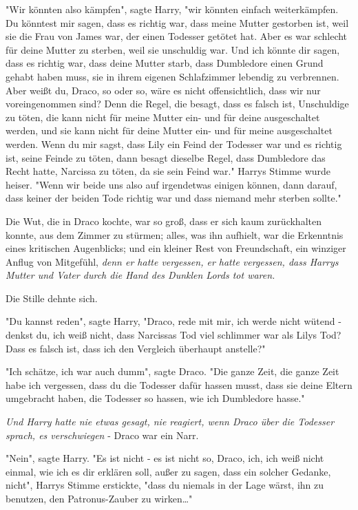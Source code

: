 {"Wir könnten also kämpfen", sagte Harry, "wir könnten einfach weiterkämpfen. Du könntest mir sagen, dass es richtig war, dass meine Mutter gestorben ist, weil sie die Frau von James war, der einen Todesser getötet hat. Aber es war schlecht für deine Mutter zu sterben, weil sie unschuldig war. Und ich könnte dir sagen, dass es richtig war, dass deine Mutter starb, dass Dumbledore einen Grund gehabt haben muss, sie in ihrem eigenen Schlafzimmer lebendig zu verbrennen. Aber weißt du, Draco, so oder so, wäre es nicht offensichtlich, dass wir nur voreingenommen sind? Denn die Regel, die besagt, dass es falsch ist, Unschuldige zu töten, die kann nicht für meine Mutter ein- und für deine ausgeschaltet werden, und sie kann nicht für deine Mutter ein- und für meine ausgeschaltet werden. Wenn du mir sagst, dass Lily ein Feind der Todesser war und es richtig ist, seine Feinde zu töten, dann besagt dieselbe Regel, dass Dumbledore das Recht hatte, Narcissa zu töten, da sie sein Feind war." Harrys Stimme wurde heiser. "Wenn wir beide uns also auf irgendetwas einigen können, dann darauf, dass keiner der beiden Tode richtig war und dass niemand mehr sterben sollte."

Die Wut, die in Draco kochte, war so groß, dass er sich kaum zurückhalten konnte, aus dem Zimmer zu stürmen; alles, was ihn aufhielt, war die Erkenntnis eines kritischen Augenblicks; und ein kleiner Rest von Freundschaft, ein winziger Anflug von Mitgefühl, \emph{denn er hatte vergessen, er hatte vergessen, dass Harrys Mutter und Vater durch die Hand des Dunklen Lords tot waren.}

Die Stille dehnte sich.

"Du kannst reden", sagte Harry, "Draco, rede mit mir, ich werde nicht wütend - denkst du, ich weiß nicht, dass Narcissas Tod viel schlimmer war als Lilys Tod? Dass es falsch ist, dass ich den Vergleich überhaupt anstelle?"

"Ich schätze, ich war auch dumm", sagte Draco. "Die ganze Zeit, die ganze Zeit habe ich vergessen, dass du die Todesser dafür hassen musst, dass sie deine Eltern umgebracht haben, die Todesser so hassen, wie ich Dumbledore hasse."

\emph{Und Harry hatte nie etwas gesagt, nie reagiert, wenn Draco über die Todesser sprach, es verschwiegen} - Draco war ein Narr.

"Nein", sagte Harry. "Es ist nicht - es ist nicht so, Draco, ich, ich weiß nicht einmal, wie ich es dir erklären soll, außer zu sagen, dass ein solcher Gedanke, nicht", Harrys Stimme erstickte, "dass du niemals in der Lage wärst, ihn zu benutzen, den Patronus-Zauber zu wirken…"

}
